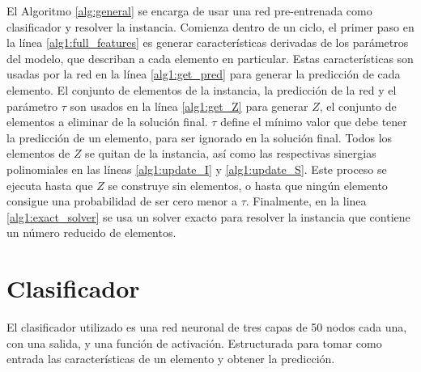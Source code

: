 \documentclass[spanish, a4paper, 12pt, openany,final]{book}
\begin{document}
El Algoritmo \ref{alg:general} se encarga de usar una red pre-entrenada como clasificador y resolver la instancia. Comienza dentro de un ciclo, el primer paso en la línea \ref{alg1:full_features} es generar características derivadas de los parámetros del modelo, que describan a cada elemento en particular. Estas características son usadas por la red en la línea \ref{alg1:get_pred} para generar la predicción de cada elemento. El conjunto de elementos de la instancia, la predicción de la red y el parámetro $\tau$ son usados en la línea \ref{alg1:get_Z} para generar $Z$, el conjunto de elementos a eliminar de la solución final. $\tau$ define el mínimo valor que debe tener la predicción de un elemento, para ser ignorado en la solución final. Todos los elementos de $Z$ se quitan de la instancia, así como las respectivas sinergias polinomiales en las líneas \ref{alg1:update_I} y \ref{alg1:update_S}. Este proceso se ejecuta hasta que $Z$ se construye sin elementos, o hasta que ningún elemento consigue una probabilidad de ser cero menor a $\tau$. Finalmente, en la linea \ref{alg1:exact_solver} se usa un solver exacto para resolver la instancia que contiene un número reducido de elementos.



\newcommand{\algrule}[1][.2pt]{\par\vskip.5\baselineskip\hrule height #1\par\vskip.5\baselineskip}


\section{Clasificador}

El clasificador utilizado es una red neuronal de tres capas de 50 nodos cada una, con una salida, y una función de activación. Estructurada para tomar como entrada las características de un elemento y obtener la predicción.
	
\end{document}
